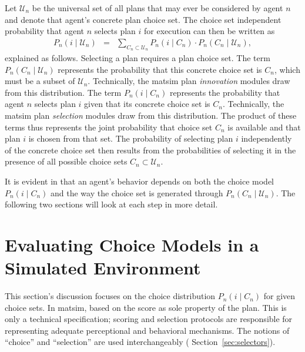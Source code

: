 Let $\mathcal{U}_n$ be the universal set of all plans that may ever be considered
by agent $n$ and  denote that agent's
concrete plan choice set.
The choice set independent probability that agent $n$
selects plan $i$ for execution can then be written as
\begin{eqnarray}
P_{n}(i\mid \mathcal{U}_n) & = & \sum_{C_{n}\subset \mathcal{U}_n}P_{n}(i\mid C_{n})\cdot P_{n}(C_{n}\mid \mathcal{U}_n),
\label{eq:unconditional-choice-proba}
\end{eqnarray} explained as
 follows. Selecting a plan requires a plan choice
set. The term $P_{n}(C_{n}\mid \mathcal{U}_n)$ represents the probability that
this concrete choice set is $C_{n}$, which must be a subset of $\mathcal{U}_n$.
Technically, the \gls{matsim} plan \emph{innovation} modules draw from this distribution.
The term $P_{n}(i\mid C_{n})$ represents the probability that agent
$n$ selects plan $i$ given that its concrete choice set is $C_{n}$.
Technically, the \gls{matsim} plan \emph{selection} modules draw from this distribution.
The product of these terms thus represents the joint probability that\corr{:}{} 
choice set $C_{n}$ is available and that plan $i$ is chosen from
that set. The probability of selecting plan $i$ independently
of the concrete choice set then results from  the
probabilities of selecting it in the presence of all possible choice sets $C_{n}\subset \mathcal{U}_n$.

It is evident in  that an agent's behavior depends on 
both the choice model $P_{n}(i\mid C_{n})$ and the way  the choice set is
generated through $P_{n}(C_{n}\mid \mathcal{U}_n)$. The following two sections
will look at each step in more detail.


\section{\label{sec:Evaluating-choice-models}Evaluating Choice Models in
a Simulated Environment}

This section's discussion focuses on the choice distribution
$P_{n}(i\mid C_{n})$ for given choice sets. In \gls{matsim}, 
based on the score as  sole property of the plan. This is only a
technical specification;  scoring and selection protocols are
responsible for representing adequate perceptional and behavioral mechanisms. 
The notions of {}``choice''
and {}``selection'' are  used interchangeably (\cf
Section~\ref{sec:selectors}).

